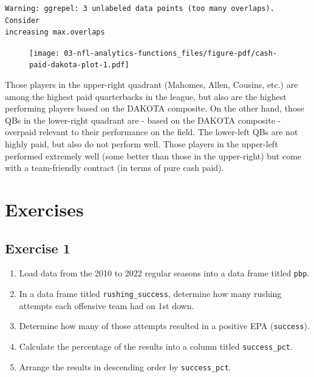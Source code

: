 \documentclass[
  letterpaper,
]{krantz}
\providecommand{\tightlist}{%
  \setlength{\itemsep}{0pt}\setlength{\parskip}{0pt}}\usepackage{longtable,booktabs,array}
\begin{document}
\begin{verbatim}
Warning: ggrepel: 3 unlabeled data points (too many overlaps). Consider
increasing max.overlaps
\end{verbatim}

\begin{figure}[H]

{\centering \texttt{[image: 03-nfl-analytics-functions\_files/figure-pdf/cash-paid-dakota-plot-1.pdf]}

}

\end{figure}

Those players in the upper-right quadrant (Mahomes, Allen, Cousins,
etc.) are among the highest paid quarterbacks in the league, but also
are the highest performing players based on the DAKOTA composite. On the
other hand, those QBs in the lower-right quadrant are - based on the
DAKOTA composite - overpaid relevant to their performance on the field.
The lower-left QBs are not highly paid, but also do not perform well.
Those players in the upper-left performed extremely well (some better
than those in the upper-right) but come with a team-friendly contract
(in terms of pure cash paid).

\hypertarget{exercises-1}{%
\section{Exercises}\label{exercises-1}}

\hypertarget{exercise-1-1}{%
\subsection{\texorpdfstring{\textbf{Exercise
1}}{Exercise 1}}\label{exercise-1-1}}

\begin{enumerate}
\def\labelenumi{\arabic{enumi}.}
\tightlist
\item
  Load data from the 2010 to 2022 regular seasons into a data frame
  titled \texttt{pbp}.
\item
  In a data frame titled \texttt{rushing\_success}, determine how many
  rushing attempts each offensive team had on 1st down.
\item
  Determine how many of those attempts resulted in a positive EPA
  (\texttt{success}).
\item
  Calculate the percentage of the results into a column titled
  \texttt{success\_pct}.
\item
  Arrange the results in descending order by \texttt{success\_pct}.
\end{enumerate}
\end{document}
